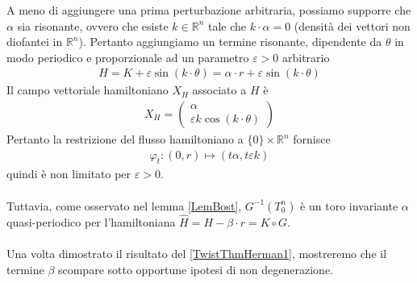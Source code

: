 \documentclass[twoside, 11pt]{amsbook}
\newcommand{\0}{{(0)}}
\newcommand{\3}{{(3)}}
\theoremstyle{colonplain}
\theoremstyle{colondefinition}
\theoremstyle{colonremark}
\numberwithin{equation}{chapter}
\begin{document}
A meno di aggiungere una prima perturbazione arbitraria, possiamo supporre che $\alpha$ sia risonante, ovvero che esiste $k \in \mathbb{R}^n$ tale che $k \cdot \alpha = 0$ (densità dei vettori non diofantei in $\mathbb{R}^n$). Pertanto aggiungiamo un termine risonante, dipendente da $\theta$ in modo periodico e proporzionale ad un parametro $\varepsilon > 0$ arbitrario
\begin{align}
    H = K + \varepsilon\sin(k \cdot \theta) = \alpha \cdot r + \varepsilon\sin(k \cdot \theta)
\end{align}
Il campo vettoriale hamiltoniano $X_H$ associato a $H$ è
\begin{align}
    X_H = \begin{pmatrix}
        \alpha \\
        \varepsilon k\cos(k \cdot \theta)
    \end{pmatrix}
\end{align}
Pertanto la restrizione del flusso hamiltoniano a $\{0\} \times \mathbb{R}^n$ fornisce
\begin{align}
    \varphi_t : (0, r) \mapsto (t\alpha, t\varepsilon k)
\end{align}
quindi è non limitato per $\varepsilon > 0$. \\ \\
Tuttavia, come osservato nel lemma \ref{LemBost}, $G^{-1}(T^n_0)$ è un toro invariante $\alpha$ quasi-periodico per l'hamiltoniana $\widehat{H} = H - \beta \cdot r = K \circ G$. \\ \\
Una volta dimostrato il risultato del \cref{TwistThmHerman1}, mostreremo che il termine $\beta$ scompare sotto opportune ipotesi di non degenerazione.
\end{document}
